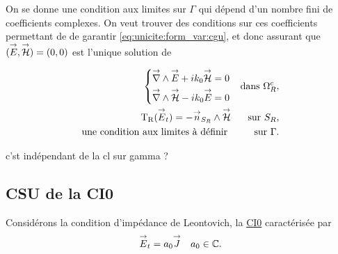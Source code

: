   On se donne une condition aux limites sur \(\Gamma\) qui dépend d'un nombre fini de coefficients complexes.
  On veut trouver des conditions sur ces coefficients permettant de de garantir  \eqref{eq:unicite:form_var:cgu}, et donc assurant que \(({\overset{\rightarrow}{E}},{\overset{\rightarrow}{\mathcal{H}}}) = (0,0)\) est l'unique solution de



  \begin{equation}
    \label{eq:unicite:probleme_sans_ci}
    \begin{aligned}
      \left\lbrace
      \begin{aligned}
        {\overset{\rightarrow}{\nabla}}\wedge{{\overset{\rightarrow}{E}}} + ik_0{\overset{\rightarrow}{\mathcal{H}}} &= 0
        \\
        {\overset{\rightarrow}{\nabla}}\wedge{{\overset{\rightarrow}{\mathcal{H}}}} - ik_0{\overset{\rightarrow}{E}} &= 0
      \end{aligned}
      \right. && \text{dans \(\Omega^c_R\)},
      \\
      \operatorname{T_R}({\overset{\rightarrow}{E}}_t) = - {\overset{\rightarrow}{n}}_{S_R} \wedge {\overset{\rightarrow}{\mathcal{H}}} && \text{sur \(S_R\),}
      \\
      \text{une condition aux limites à définir }  && \text{sur \(\Gamma\).}
    \end{aligned}
  \end{equation}
\begin{REM}
  c'st indépendant de la cl sur gamma ?
\end{REM}
  \subsection{CSU de la CI0}
    Considérons la condition d’impédance de Leontovich, la \hyperlink{ci0}{CI0} caractérisée par
    \begin{align}
      \label{eq:unicite:ci0}
      {\overset{\rightarrow}{E}}_t = a_0 {\overset{\rightarrow}{J}} &&  a_0 \in \mathbb C.
    \end{align}

